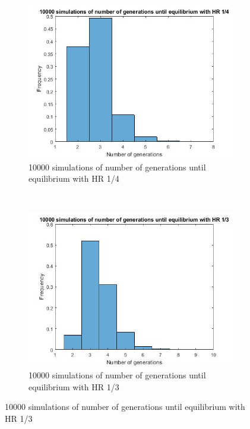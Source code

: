 \begin{figure}[H]
	
    \centering
    \begin{subfigure}{0.4\textwidth}
        \includegraphics[width=\textwidth]{GenormHistogramAantalgen4}
        \caption{10000 simulations of number of generations until equilibrium with HR 1/4}
        \label{fig:gull}
    \end{subfigure}
    ~ %
    \begin{subfigure}{0.4\textwidth}
        \includegraphics[width=\textwidth]{GenormHistogramAantalgen}
        \caption{10000 simulations of number of generations until equilibrium with HR 1/3}

\end{subfigure}
\end{figure}
